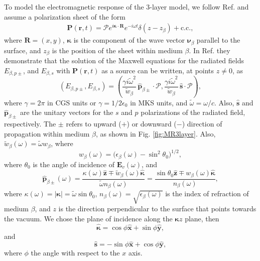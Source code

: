 To model the electromagnetic response of the 3-layer model, we follow Ref.
\cite{mizrahiJOSA88} and assume a polarization sheet of the form
\begin{align}\label{m31}
\mathbf{P}(\mathbf{r},t) = \boldsymbol{\mathcal{P}}
  e^{i\boldsymbol{\kappa}\cdot\mathbf{R}}e^{-i\omega t}\delta(z - z_{\beta}) 
+ \mathrm{c.c.},
\end{align}
where $\mathbf{R}=(x,y)$, $\boldsymbol{\kappa}$ is the component of the wave
vector $\boldsymbol{\nu}_{\beta}$ parallel to the surface, and
$z_{\beta}$ is the position of the sheet within medium $\beta$. In Ref.
\cite{sipeJOSAB87} they demonstrate that the solution of the Maxwell equations
for the radiated fields $E_{\beta,p\pm}$, and $E_{\beta,s}$ with
$\mathbf{P}(\mathbf{r},t)$ as a source can be written, at points $z\neq 0$, as
\begin{equation}\label{r2}
(E_{\beta,p\pm},E_{\beta,s}) = 
(\frac{\gamma i\tilde\omega^2}{\tilde w_{\beta}}
\,\hat{\mathbf{p}}_{\beta\pm}\cdot\boldsymbol{\mathcal{P}},
\frac{\gamma i\tilde\omega^2}{\tilde w_{\beta}}
\,\hat{\mathbf{s}}\cdot\boldsymbol{\mathcal{P}}),
\end{equation} 
where $\gamma=2\pi$ in CGS units or $\gamma=1/2\epsilon_{0}$ in MKS units, and
$\tilde\omega=\omega/c$. Also, $\hat{\mathbf{s}}$ and
$\hat{\mathbf{p}}_{\beta\pm}$ are the unitary vectors for the $s$ and $p$
polarizations of the radiated field, respectively. The $\pm$ refers to upward
($+$) or downward ($-$) direction of propagation within medium $\beta$, as shown
in Fig. \ref{fig:MR3layer}. Also, $\tilde{w}_{\beta}(\omega)=\tilde{\omega}
w_{\beta}$, where
\begin{equation}\label{r3}
w_{\beta}(\omega) = 
\big(\epsilon_{\beta}(\omega) - \sin^{2}\theta_{0}\big)^{1/2},
\end{equation}
where $\theta_{0}$ is the angle of incidence of $\mathbf{E}_{v}(\omega)$, 
and
\begin{equation}\label{r4}
\hat{\mathbf{p}}_{\beta\pm}(\omega) =
\frac{\kappa(\omega)\hat{\mathbf{z}}\mp 
     \tilde{w}_{\beta}(\omega)\hat{\boldsymbol{\kappa}}} 
{\tilde\omega n_{\beta}(\omega)}
=
\frac{\sin\theta_{0}\hat{\mathbf{z}}\mp 
  w_{\beta}(\omega)\hat{\boldsymbol{\kappa}}} 
{n_{\beta}(\omega)}
,
\end{equation}
where $\kappa(\omega)=|\boldsymbol{\kappa}|=\tilde\omega\sin\theta_{0}$, $n_{\beta}(\omega)=\sqrt{\epsilon_{\beta}(\omega)}$ is the index of refraction of medium $\beta$, and $z$ is the direction perpendicular to the surface that points towards the vacuum. We chose the plane of incidence along the $\boldsymbol{\kappa}z$ plane, then
\begin{equation}\label{mc1}
\hat{\boldsymbol{\kappa}}
= \cos\phi\hat{\mathbf{x}} + \sin\phi\hat{\mathbf{y}},
\end{equation}
and
\begin{equation}\label{mmc2}
\hat{\mathbf{s}} = -\sin\phi\hat{\mathbf{x}} + \cos\phi\hat{\mathbf{y}},
\end{equation}
where $\phi$ the angle with respect to the $x$ axis.

